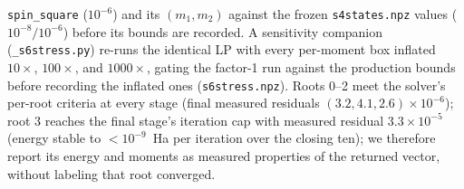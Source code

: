 \documentclass[11pt]{article}
\begin{document}
\texttt{spin\_square} ($10^{-6}$) and its $(m_1, m_2)$ against the frozen \texttt{s4states.npz} values ($10^{-8}/10^{-6}$) before its bounds are recorded. A sensitivity companion (\texttt{\_s6stress.py}) re-runs the identical LP with every per-moment box inflated $10\times$, $100\times$, and $1000\times$, gating the factor-1 run against the production bounds before recording the inflated ones (\texttt{s6stress.npz}). Roots 0--2 meet the solver's per-root criteria at every stage (final measured residuals $(3.2, 4.1, 2.6)\times10^{-6}$); root 3 reaches the final stage's iteration cap with measured residual $3.3\times10^{-5}$ (energy stable to $<10^{-9}$~Ha per iteration over the closing ten); we therefore report its energy and moments as measured properties of the returned vector, without labeling that root converged.
\end{document}
